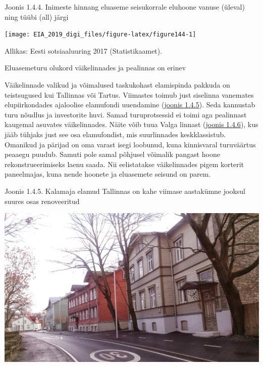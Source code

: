 \documentclass[estonian,]{article}
\begin{document}
{Joonis 1.4.4.} Inimeste hinnang eluaseme seisukorrale eluhoone vanuse (üleval) ning tüübi (all) järgi

\begin{center}\texttt{[image: EIA\_2019\_digi\_files/figure-latex/figure144-1]} \end{center}

\begin{imgsource}
{Allikas:} Eesti sotsiaaluuring 2017 (Statistikaamet).
\end{imgsource}

Eluasemeturu olukord väikelinnades ja pealinnas on erinev

Väikelinnade valikud ja võimalused taskukohast elamispinda pakkuda on teistsugused kui Tallinnas või Tartus. Viimastes toimub just siselinna vanemates elupiirkondades ajaloolise elamufondi uuendamine (\protect\hyperlink{figure145}{joonis 1.4.5}). Seda kannustab turu nõudlus ja investorite huvi. Samad turuprotsessid ei toimi aga pealinnast kaugemal asuvates väikelinnades. Näite võib tuua Valga linnast (\protect\hyperlink{figure146}{joonis 1.4.6}), kus jääb tühjaks just see osa elamufondist, mis suurlinnades keskklassistub. Omanikud ja pärijad on oma varast isegi loobunud, kuna kinnisvaral turuväärtus peaaegu puudub. Samuti pole samal põhjusel võimalik pangast hoone rekonstrueerimiseks laenu saada. Nii eelistatakse väikelinnades pigem korterit paneelmajas, kuna nende hoonete ja eluasemete seisund on parem.

{Joonis 1.4.5.} Kalamaja elamud Tallinnas on kahe viimase aastakümne jooksul suures osas renoveeritud

\begin{center}\includegraphics[width=1\linewidth]{figures/1-chapter/fig145} \end{center}
\end{document}
